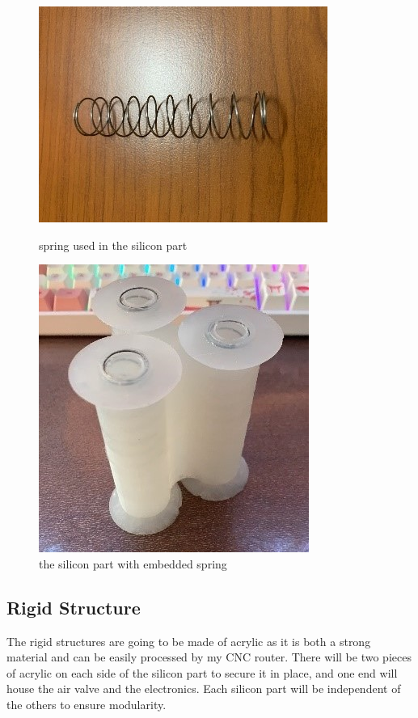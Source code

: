 \documentclass[twoside]{article}
\begin{document}
\begin{figure}[H]
	\centering
	\begin{minipage}{0.45\textwidth}
		\centering
		\includegraphics[angle=-90]{spring}
		\caption{spring used in the silicon part}
	\end{minipage}
	\hfill	
	\begin{minipage}{0.45\textwidth}
		\centering
		\includegraphics{silicon_with_spring}
		\caption{the silicon part with embedded spring}
	\end{minipage}
\end{figure}

\subsection{Rigid Structure}
The rigid structures are going to be made of acrylic as it is both a strong material and can be easily processed by my CNC router. There will be two pieces of acrylic on each side of the silicon part to secure it in place, and one end will house the air valve and the electronics. Each silicon part will be independent of the others to ensure modularity.
\end{document}
